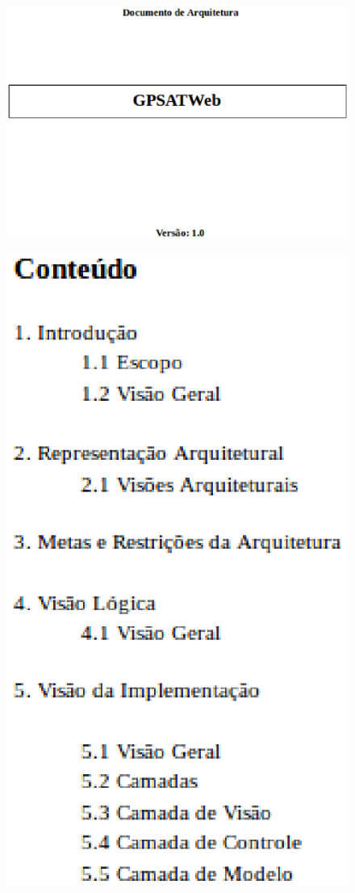 \begin{apendicesenv}
	\begin{figure}[H]
		    \label{fig26}
		        \includegraphics[keepaspectratio=true, scale=1]{editaveis/images/arqpag1.eps}
	\end{figure}
	\newpage
	\begin{figure}[H]
		    \label{fig27}
		        \includegraphics[keepaspectratio=true, scale=1]{editaveis/images/arqpag2.eps}

\end{figure}
\end{apendicesenv}

